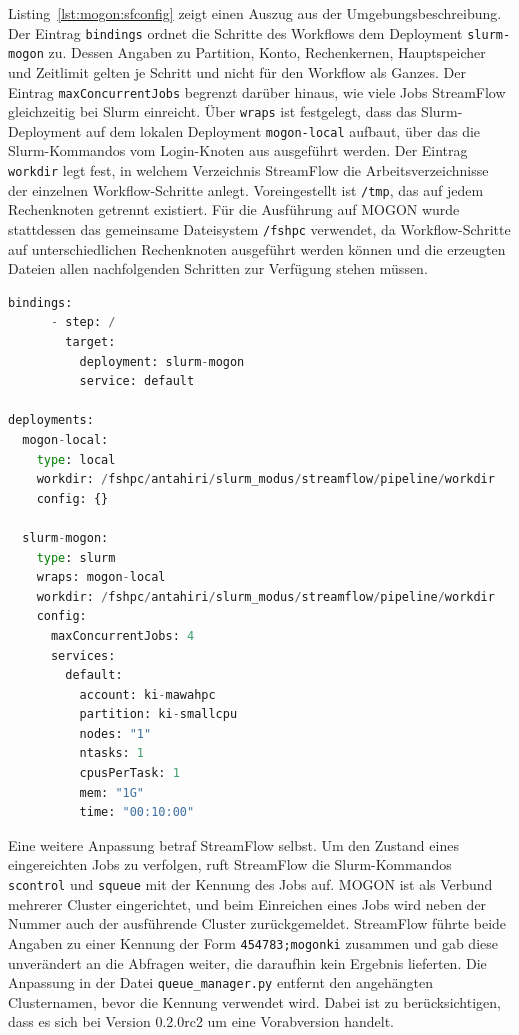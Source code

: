 Listing~\ref{lst:mogon:sfconfig} zeigt einen Auszug aus der
Umgebungsbeschreibung. Der Eintrag \texttt{bindings} ordnet die
Schritte des Workflows dem Deployment \texttt{slurm-mogon} zu.
Dessen Angaben zu Partition, Konto, Rechenkernen, Hauptspeicher und
Zeitlimit gelten je Schritt und nicht für den Workflow als Ganzes.
Der Eintrag \texttt{maxConcurrentJobs} begrenzt darüber hinaus, wie
viele Jobs StreamFlow gleichzeitig bei Slurm einreicht. Über
\texttt{wraps} ist festgelegt, dass das Slurm-Deployment auf dem
lokalen Deployment \texttt{mogon-local} aufbaut, über das die
Slurm-Kommandos vom Login-Knoten aus ausgeführt werden. Der Eintrag
\texttt{workdir} legt fest, in welchem Verzeichnis StreamFlow die
Arbeitsverzeichnisse der einzelnen Workflow-Schritte anlegt.
Voreingestellt ist \texttt{/tmp}, das auf jedem Rechenknoten
getrennt existiert. Für die Ausführung auf MOGON wurde stattdessen
das gemeinsame Dateisystem \texttt{/fshpc} verwendet, da
Workflow-Schritte auf unterschiedlichen Rechenknoten ausgeführt
werden können und die erzeugten Dateien allen nachfolgenden
Schritten zur Verfügung stehen müssen.

\begin{lstlisting}[language=Python,
  caption={Auszug aus der Umgebungsbeschreibung von StreamFlow für die Ausführung auf MOGON},
  label={lst:mogon:sfconfig}]
    bindings:
      - step: /
        target:
          deployment: slurm-mogon
          service: default

deployments:
  mogon-local:
    type: local
    workdir: /fshpc/antahiri/slurm_modus/streamflow/pipeline/workdir
    config: {}

  slurm-mogon:
    type: slurm
    wraps: mogon-local
    workdir: /fshpc/antahiri/slurm_modus/streamflow/pipeline/workdir
    config: 
      maxConcurrentJobs: 4
      services:
        default:
          account: ki-mawahpc
          partition: ki-smallcpu
          nodes: "1"
          ntasks: 1
          cpusPerTask: 1
          mem: "1G"
          time: "00:10:00"
\end{lstlisting}

Eine weitere Anpassung betraf StreamFlow selbst. Um den Zustand
eines eingereichten Jobs zu verfolgen, ruft StreamFlow die
Slurm-Kommandos \texttt{scontrol} und \texttt{squeue} mit der
Kennung des Jobs auf. MOGON ist als Verbund mehrerer Cluster
eingerichtet, und beim Einreichen eines Jobs wird neben der Nummer
auch der ausführende Cluster zurückgemeldet. StreamFlow führte
beide Angaben zu einer Kennung der Form \texttt{454783;mogonki}
zusammen und gab diese unverändert an die Abfragen weiter, die
daraufhin kein Ergebnis lieferten. Die Anpassung in der Datei
\texttt{queue\_manager.py} entfernt den angehängten Clusternamen,
bevor die Kennung verwendet wird. Dabei ist zu berücksichtigen,
dass es sich bei Version 0.2.0rc2 um eine Vorabversion handelt.

